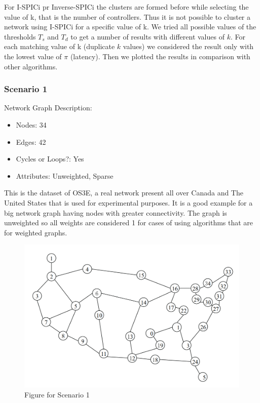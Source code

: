 \documentclass[10pt]{extarticle}
\begin{document}
	For I-SPICi pr Inverse-SPICi the clusters are formed before while selecting the value of k, that is the number of controllers. Thus it is not possible to cluster a network using I-SPICi for a specific value of k. We tried all possible values of the thresholds $T_s$ and $T_d$ to get a number of results with different values of $k$. For each matching value of k (duplicate $k$ values) we considered the result only with the lowest value of $\pi$ (latency). Then we plotted the results in comparison with other algorithms.
	\subsubsection{Scenario 1}
	Network Graph Description:
	\begin{itemize}
		\item Nodes: 34
		\item Edges: 42
		\item Cycles or Loops?: Yes
		\item Attributes: Unweighted, Sparse
	\end{itemize}
	This is the dataset of OS3E, a real network present all over Canada and The United States that is used for experimental purposes. It is a good example for a big network graph having nodes with greater connectivity. The graph is unweighted so all weights are considered 1 for cases of using algorithms that are for weighted graphs.
	\begin{figure}
		\includegraphics[width=\linewidth]{OS3E.png}
		\caption{Figure for Scenario 1}
		\label{fig:os3e}
	\end{figure}
\end{document}
